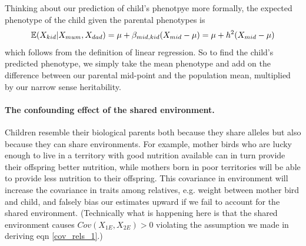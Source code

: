 Thinking about our prediction of child's phenotpye more formally, the expected phenotype of the child given the parental
phenotypes is
\begin{equation}
\mathbb{E}(X_{kid} | X_{mum},X_{dad}) = \mu +
\beta_{mid,kid}(X_{mid} - \mu) =\mu + h^2(X_{mid} - \mu)  \label{predict_kid}
\end{equation}
which follows from the definition of linear regression. So to find the
child's predicted phenotype, we simply take the mean phenotype and add on the difference between our parental mid-point and the population mean, multiplied by our
narrow sense heritability. \\



\paragraph{The confounding effect of the shared environment.}
Children resemble their biological parents both because they share alleles but
also because they can share environments. For example, mother
birds who are lucky enough to live in a territory with good nutrition
available can in turn provide their offspring better nutrition, while
mothers born in poor territories will be able to provide less
nutrition to their offspring.  This covariance in environment will
increase the covariance in traits among relatives, e.g. weight between
mother bird and child, and falsely bias our estimates upward if we
fail to account for the shared environment. (Technically what is
happening here is that the shared environment causes
$Cov(X_{1E},X_{2E})>0$ violating the assumption we made in deriving
eqn \eqref{cov_rels_1}.)


